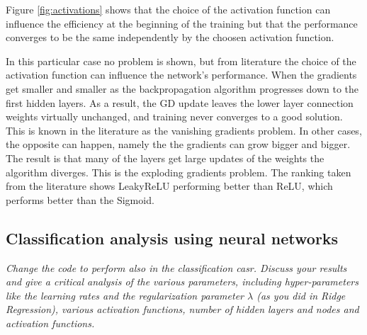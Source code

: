 \documentclass[english,notitlepage,reprint,nofootinbib]{revtex4-1}  %
\begin{document}
Figure \ref{fig:activations} shows that the choice of the activation function can influence the efficiency at the beginning of the training but that the performance converges to be the same independently by the choosen activation function.

In this particular case no problem is shown, but from literature the choice of the activation function can influence the network's performance.
When the gradients get smaller and smaller as the backpropagation algorithm progresses down to the first hidden layers. As a result, the GD update leaves the lower layer connection weights virtually unchanged, and training never converges to a good solution. This is known in the literature as the vanishing gradients problem. In other cases, the opposite can happen, namely the the gradients can grow bigger and bigger. The result is that many of the layers get large updates of the weights the algorithm diverges. This is the exploding gradients problem. The ranking taken from the literature shows LeakyReLU performing better than ReLU, which performs better than the Sigmoid.

\subsection{Classification  analysis using neural networks}

\textit{Change the code to perform also in the classification casr. Discuss your results and give a critical analysis of the various parameters, including hyper-parameters like the learning rates and the regularization parameter $\lambda$ (as you did in Ridge Regression), various activation functions, number of hidden layers and nodes and activation functions.}
\end{document}

